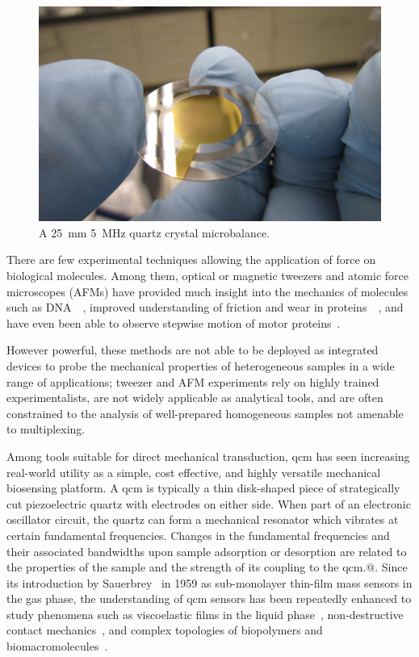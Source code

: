 \begin{figure}[ht]
  \centering
  \includegraphics[keepaspectratio,width=12cm]{qcm/figures/qcm_holding.jpg}
  \caption{A \SI{25}{\milli\meter} \SI{5}{\mega\hertz} quartz crystal microbalance.}
  \label{fig:qcmholding}
\end{figure}
There are few experimental techniques allowing the application of force
on biological molecules. Among them, optical or magnetic tweezers and
atomic force microscopes (AFMs) have provided much insight into the
mechanics of molecules such as
DNA~\cite{cui2000pulling}~\cite{marko1995stretching}, improved
understanding of friction and wear in
proteins~\cite{suda2001origin}~\cite{bormuth2009protein}, and have even
been able to observe stepwise motion of motor
proteins~\cite{asbury2003kinesin}.

However powerful, these methods are not able to be deployed as integrated
devices to probe the mechanical properties of heterogeneous samples in a
wide range of applications; tweezer and AFM experiments rely on highly
trained experimentalists, are not widely applicable as analytical tools,
and are often constrained to the analysis of well-prepared homogeneous
samples not amenable to multiplexing.

Among tools suitable for direct mechanical transduction, \gls{qcm}
has seen increasing real-world utility as a simple, cost
effective, and highly versatile mechanical biosensing platform. A \gls{qcm} is
typically a thin disk-shaped piece of strategically cut piezoelectric
quartz with electrodes on either side. When part of an electronic
oscillator circuit, the quartz can form a mechanical resonator which
vibrates at certain fundamental frequencies. Changes in the fundamental
frequencies and their associated bandwidths upon sample adsorption or
desorption are related to the properties of the sample and the strength of
its coupling to the \gls{qcm}.@. Since its introduction by
Sauerbrey~\cite{sauerbrey1959verwendung} in 1959 as sub-monolayer thin-film
mass sensors in the gas phase, the understanding of \gls{qcm} sensors has been
repeatedly enhanced to study phenomena such as viscoelastic films in the
liquid phase~\cite{kanazawa1985frequency}, non-destructive contact
mechanics~\cite{johannsman2007contacts}, and complex topologies of
biopolymers and biomacromolecules~\cite{marx2003quartz}.


